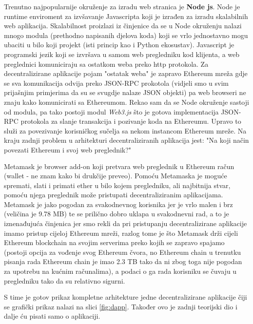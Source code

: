 \documentclass[a4paper,oneside,12pt]{memoir} %
\begin{document}
Trenutno najpopularnije okruženje za izradu web stranica je \textbf{Node js}. Node je runtime enviroment za izvšavanje Javascripta koji je izrađen za izradu skalabilnih web aplikacija. Skalabilnost proizlazi iz činjenice da se u Node okruženju nalazi mnogo modula (prethodno napisanih djelova koda) koji se vrlo jednostavno mogu ubaciti u bilo koji projekt (isti princip kao i Python ekosustav). Javascript je programski jezik koji se izvršava u samom web pregledniku kod klijenta, a web preglednici komuniciraju sa ostatkom weba preko http protokola. Za decentralizirane aplikacije pojam "ostatak weba" je zapravo Ethereum mreža gdje se sva komunikacija odvija preko JSON-RPC prokotola (vidjeli smo u svim prijašnjim primjerima da su se svugdje nalaze JSON objekti) pa web browseri ne znaju kako komunicirati sa Ethereumom. Rekao sam da se Node okruženje sastoji od modula, pa tako postoji modul \emph{Web3.js} što je gotova implementacija JSON-RPC protokola za slanje transakcija i pozivanje koda na Ethereumu. Upravo to služi za povezivanje korisničkog sučelja sa nekom instancom Ethereum mreže. Na kraju zadnji problem u arhitekturi decentraliziranih aplikacija jest: "Na koji način povezati Ethereum i svoj web preglednik?"

Metamask je browser add-on koji pretvara web preglednik u Ethereum račun (wallet - ne znam kako bi drukčije preveo). Pomoću Metamaska je moguće spremati, slati i primati ether u bilo kojem pregledniku, ali najbitnija stvar, pomoću njega preglednik može pristupati decentraliziranim aplikacijama. Metamask je jako pogodan za svakodnevnog korisnika jer je vrlo malen i brz (veličina je 9.78 MB) te se prilično dobro uklapa u svakodnevni rad, a to je iznenađujuća činjenica jer smo rekli da pri pristupanju decentralizirane aplikacije imamo pristup cijeloj Ethereum mreži, razlog tome je što Metamask drži cijeli Ethereum blockchain na svojim serverima preko kojih se zapravo spajamo (postoji opcija za vođenje svog Ethereum čvora, no Ethereum chain u trenutku pisanja rada Ethereum chain je imao 2.3 TB tako da ni zbog toga nije pogodan za upotrebu na kućnim računalima), a podaci o ga rada korisniku se čuvaju u pregledniku tako da su relativno sigurni.

S time je gotov prikaz kompletne arhitekture jedne decentralizirane aplikacije čiji se grafički prikaz nalazi na slici \ref{fig:dapp}. Također ovo je zadnji teorijski dio i dalje ću pisati samo o aplikaciji.
\end{document}
